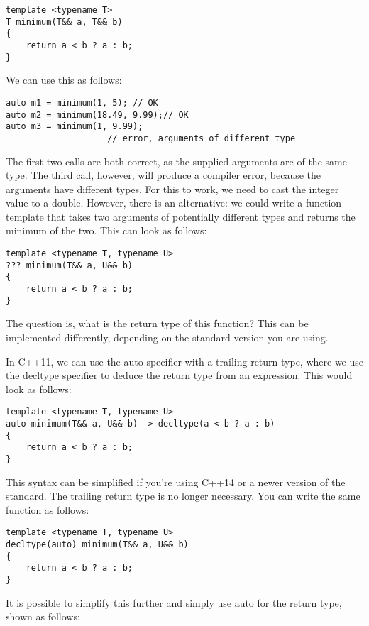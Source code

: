 \begin{lstlisting}[style=styleCXX]
template <typename T>
T minimum(T&& a, T&& b)
{
	return a < b ? a : b;
}
\end{lstlisting}

We can use this as follows:

\begin{lstlisting}[style=styleCXX]
auto m1 = minimum(1, 5); // OK
auto m2 = minimum(18.49, 9.99);// OK
auto m3 = minimum(1, 9.99);
                    // error, arguments of different type
\end{lstlisting}

The first two calls are both correct, as the supplied arguments are of the same type. The third call, however, will produce a compiler error, because the arguments have different types. For this to work, we need to cast the integer value to a double. However, there is an alternative: we could write a function template that takes two arguments of potentially different types and returns the minimum of the two. This can look as follows:

\begin{lstlisting}[style=styleCXX]
template <typename T, typename U>
??? minimum(T&& a, U&& b)
{
	return a < b ? a : b;
}
\end{lstlisting}

The question is, what is the return type of this function? This can be implemented differently, depending on the standard version you are using.

In C++11, we can use the auto specifier with a trailing return type, where we use the decltype specifier to deduce the return type from an expression. This would look as follows:

\begin{lstlisting}[style=styleCXX]
template <typename T, typename U>
auto minimum(T&& a, U&& b) -> decltype(a < b ? a : b)
{
	return a < b ? a : b;
}
\end{lstlisting}

This syntax can be simplified if you’re using C++14 or a newer version of the standard. The trailing return type is no longer necessary. You can write the same function as follows:

\begin{lstlisting}[style=styleCXX]
template <typename T, typename U>
decltype(auto) minimum(T&& a, U&& b)
{
	return a < b ? a : b;
}
\end{lstlisting}

It is possible to simplify this further and simply use auto for the return type, shown as follows:

